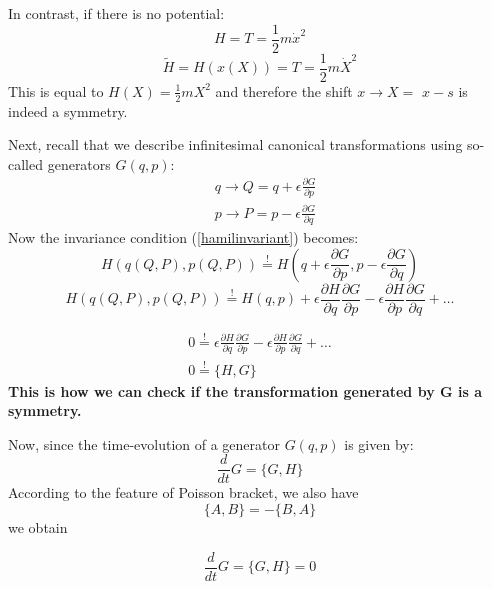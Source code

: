 In contrast, if there is no potential:
$$
H=T=\frac{1}{2} m \dot{x}^{2}
$$
$$
\tilde{H}=H(x(X))=T=\frac{1}{2} m \dot{X}^{2}
$$
This is equal to $H(X)=\frac{1}{2} m X^{2}$ and therefore the shift $x \rightarrow X=$ $x-s$ is indeed a symmetry.

Next, recall that we describe infinitesimal canonical transformations using so-called generators $G(q,p)$:
$$
\begin{aligned}
&q \rightarrow Q=q+\epsilon \frac{\partial G}{\partial p}\\
&p \rightarrow P=p-\epsilon \frac{\partial G}{\partial q}
\end{aligned}
$$
Now the invariance condition (\ref{hamilinvariant}) becomes:
$$
H(q(Q, P), p(Q, P)) \stackrel{!}{=} H\left(q+\epsilon \frac{\partial G}{\partial p}, p-\epsilon \frac{\partial G}{\partial q}\right)
$$
$$
H(q(Q, P), p(Q, P)) \stackrel{!}{=} H(q, p)+\epsilon \frac{\partial H}{\partial q} \frac{\partial G}{\partial p}-\epsilon \frac{\partial H}{\partial p} \frac{\partial G}{\partial q}+\ldots
$$
\begin{qt}
    \begin{equation}
        \begin{array}{l}
{0 \stackrel{!}{=} \epsilon \frac{\partial H}{\partial q} \frac{\partial G}{\partial p}-\epsilon \frac{\partial H}{\partial p} \frac{\partial G}{\partial q}+\ldots} \\
{0 \stackrel{!}{=}\{H, G\}}
\end{array}
    \end{equation}
    \textbf{This is how we can check if the transformation generated by G is a symmetry.}
\end{qt}
Now, since the time-evolution of a generator $G(q,p)$ is given by:
$$
\frac{d}{d t} G=\{G, H\}
$$
According to the feature of Poisson bracket, we also have
\begin{equation}
\{A, B\}=-\{B, A\}
\end{equation}
we obtain
\begin{qt}
    \begin{equation}
\frac{d}{d t} G=\{G, H\} = 0
\end{equation}
\end{qt}

